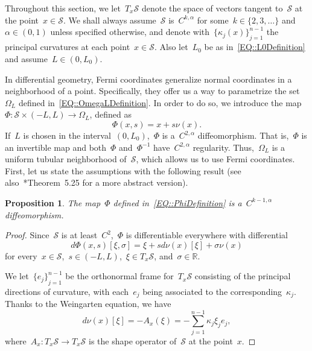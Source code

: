 \documentclass[12pt,a4paper]{amsart}
\numberwithin{equation}{section}
\newtheorem{proposition}[theorem]{Proposition}
\theoremstyle{definition}
\theoremstyle{remark}
\newcommand{\R}{\mathbb{R}}
\begin{document}
\begin{appendix}
Throughout this section, we let~$T_x\mathcal{S}$ denote the space of vectors tangent to~$\mathcal{S}$ at the point~$x \in \mathcal{S}$. We shall always assume~$\mathcal{S}$ is~$C^{k,\alpha}$ for some~$k \in \{2,3,\dots\}$ and~$\alpha \in (0,1)$ unless specified otherwise, and denote with~${\{\kappa_j(x)\}}_{j=1}^{n-1}$ the principal curvatures at each point~$x \in \mathcal{S}$. Also let~$L_0$ be as in~\eqref{EQ::L0Definition} and assume~$L \in (0,L_0)$.

In differential geometry, Fermi coordinates generalize normal coordinates in a neighborhood of a point. Specifically, they offer us a way to parametrize the set~$\Omega_L$ defined in~\eqref{EQ::OmegaLDefinition}. In order to do so, we introduce the map~$\Phi \colon \mathcal{S} \times (-L, L) \to \Omega_L$, defined as
\begin{equation}\label{EQ::PhiDefinition}
    \Phi(x, s) = x + s \nu(x).
\end{equation}
If~$L$ is chosen in the interval~$(0,L_0)$,~$\Phi$ is a~$C^{2,\alpha}$ diffeomorphism. That is,~$\Phi$ is an invertible map and both~$\Phi$ and~$\Phi^{-1}$ have~$C^{2,\alpha}$ regularity. Thus,~$\Omega_L$ is a uniform tubular neighborhood of~$\mathcal{S}$, which allows us to use Fermi coordinates. First, let us state the assumptions with the following result (see also~\cite{MR3887684}*{Theorem~5.25} for a more abstract version).

\begin{proposition}\label{PROP::TubularNeighborhood}
    The map~$\Phi$ defined in~\eqref{EQ::PhiDefinition} is a~$C^{k-1,\alpha}$ diffeomorphism.
\end{proposition}

\begin{proof}
    Since~$\mathcal{S}$ is at least~$C^2$,~$\Phi$ is differentiable everywhere with differential
    \begin{equation}\label{EQ::PhiDifferential}
        d\Phi(x,s)[\xi, \sigma] = \xi + s d\nu(x)[\xi] + \sigma\nu(x)
    \end{equation}
    for every~$x \in \mathcal{S}$,~$s \in (-L, L)$,~$\xi \in T_x\mathcal{S}$, and~$\sigma \in \R$.

    We let~${\{e_j\}}_{j=1}^{n-1}$ be the orthonormal frame for~$T_x\mathcal{S}$ consisting of the principal directions of curvature, with each~$e_j$ being associated to the corresponding~$\kappa_j$. Thanks to the Weingarten equation, we have
    \begin{equation}\label{EQ::ShapeOperator}
        d\nu(x)[\xi] = -A_x(\xi) = -\sum_{j=1}^{n-1} \kappa_j \xi_j e_j,
    \end{equation}
    where~$A_x \colon T_x\mathcal{S} \to T_x\mathcal{S}$ is the shape operator of~$\mathcal{S}$ at the point~$x$.


\end{proof}
\end{appendix}
\end{document}
